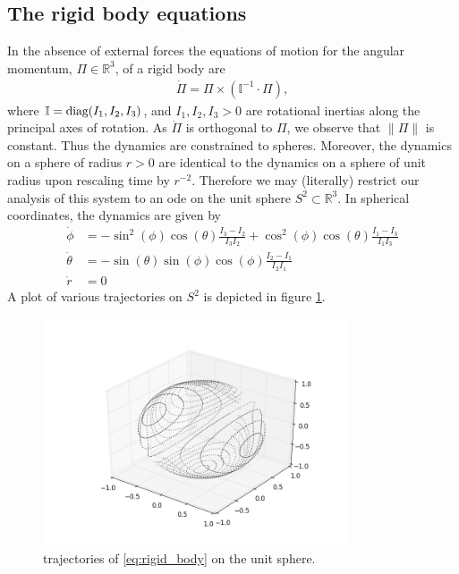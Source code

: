 \documentclass[letterpaper, 12 pt]{amsart}
\newcommand{\R}{\mathbb{R}}
\begin{document}
\subsection{The rigid body equations}
In the absence of external forces
the equations of motion for the angular momentum, $\Pi \in \R^3$,
of a rigid body are
\begin{align}
  \dot{\Pi} = \Pi \times ( \mathbb{I}^{-1}\cdot \Pi),  \label{eq:rigid_body}
\end{align}
where $\mathbb{I} = {\rm diag}(I_1,I_2,I_3)$,
and $I_1,I_2,I_3 > 0$ are rotational inertias along
the principal axes of rotation.
As $\dot{\Pi}$ is orthogonal to $\Pi$, we observe that
$\| \Pi \|$ is constant.  Thus the dynamics are constrained
to spheres.  Moreover, the dynamics on a sphere of radius $r>0$
are identical to the dynamics on a sphere of unit radius
upon rescaling time by $r^{-2}$.
Therefore we may (literally) restrict our analysis of this system
to an ode on the unit sphere $S^2 \subset \R^3$.
In spherical coordinates, the dynamics are given by
\begin{align*}
  \dot{\phi} &= -\sin^2(\phi) \cos(\theta) \frac{I_3-I_2}{I_3I_2}
  + \cos^2(\phi) \cos(\theta) \frac{I_1 - I_3}{I_1 I_3} \\
  \dot{\theta} &= - \sin(\theta) \sin(\phi) \cos(\phi) \frac{I_2 - I_1}{I_2I_1} \\
  \dot{r} &= 0
\end{align*}
A plot of various trajectories on $S^2$ is depicted in figure \ref{fig:rigid_body_traj}.

\begin{figure}[p]
  \centering
  \includegraphics[width=0.8\textwidth]{./images/rigid_body_traj.png}
  \caption{trajectories of \eqref{eq:rigid_body} on the unit sphere.}
  \label{fig:rigid_body_traj}
\end{figure}
\end{document}
